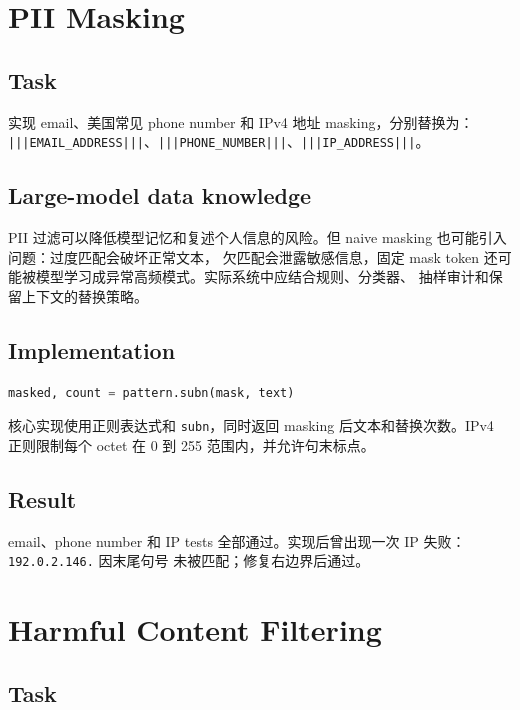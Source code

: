 \documentclass[UTF8,11pt]{ctexart}
\begin{document}
\section{PII Masking}

\subsection*{Task}

实现 email、美国常见 phone number 和 IPv4 地址 masking，分别替换为：
\texttt{|||EMAIL\_ADDRESS|||}、\texttt{|||PHONE\_NUMBER|||}、\texttt{|||IP\_ADDRESS|||}。

\subsection*{Large-model data knowledge}

PII 过滤可以降低模型记忆和复述个人信息的风险。但 naive masking 也可能引入问题：过度匹配会破坏正常文本，
欠匹配会泄露敏感信息，固定 mask token 还可能被模型学习成异常高频模式。实际系统中应结合规则、分类器、
抽样审计和保留上下文的替换策略。

\subsection*{Implementation}

\begin{lstlisting}[language=Python]
masked, count = pattern.subn(mask, text)
\end{lstlisting}

核心实现使用正则表达式和 \texttt{subn}，同时返回 masking 后文本和替换次数。IPv4 正则限制每个 octet
在 0 到 255 范围内，并允许句末标点。

\subsection*{Result}

email、phone number 和 IP tests 全部通过。实现后曾出现一次 IP 失败：\texttt{192.0.2.146.} 因末尾句号
未被匹配；修复右边界后通过。

\section{Harmful Content Filtering}

\subsection*{Task}
\end{document}
